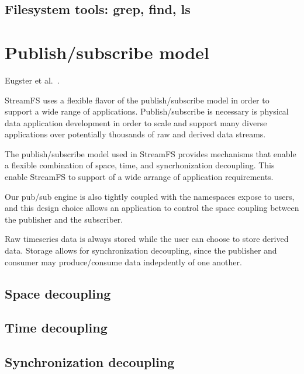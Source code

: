 \documentclass[10pt,print,letterpaper]{sigplan-proc-varsize}
\begin{document}
\subsection{Filesystem tools: grep, find, ls}

\section{Publish/subscribe model}
Eugster et al.~\cite{eugster}.

StreamFS uses a flexible flavor of the publish/subscribe model in order to support a wide range of applications.  
Publish/subscribe is necessary is physical data application development in order to scale and support many diverse 
applications over potentially thousands of raw and derived data streams.

The publish/subscribe model used in StreamFS provides mechanisms that enable a flexible combination of space, time,
and syncrhonization decoupling.  This enable StreamFS to support of a wide arrange of application requirements.

Our pub/sub engine is also tightly coupled with the namespaces expose to users, and this design choice allows an application
to control the space coupling between the publisher and the subscriber.

Raw timeseries data is always stored while the user can choose to store derived data.  Storage allows for synchronization decoupling,
since the publisher and consumer may produce/consume data indepdently of one another.


\subsection{Space decoupling}
\subsection{Time decoupling}
\subsection{Synchronization decoupling}



\vspace{+0.5mm}
\vspace{+2mm}


\end{document}
